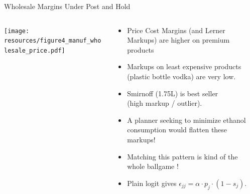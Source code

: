 \documentclass[aspectratio=169,10pt]{beamer}
\begin{document}
\begin{frame}{Wholesale Margins Under Post and Hold}
\begin{columns}[T]
\begin{column}{.5\textwidth}
\begin{center}
\texttt{[image: resources/figure4\_manuf\_wholesale\_price.pdf]}
\end{center}
\end{column}
\hfill
\begin{column}{.5\textwidth}
  \begin{itemize}
  \item Price Cost Margins (and Lerner Markups) are higher on premium products
  \item Markups on least expensive products (plastic bottle vodka) are very low.
  \item Smirnoff (1.75L) is best seller\\ (high markup / outlier).
  \item A planner seeking to minimize ethanol consumption would flatten these markups!
  \item Matching this pattern is kind of the whole ballgame !
  \item Plain logit gives $\epsilon_{jj} = \alpha \cdot p_j  \cdot (1-s_j)$.
  \end{itemize}
  \end{column}
\end{columns}
\end{frame}
\end{document}
